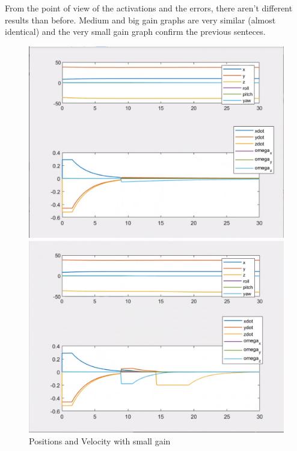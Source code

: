 \documentclass{article}
\begin{document}
From the point of view of the activations and the errors, there aren't different results than before. Medium and big gain graphs are very similar (almost identical) and the very small gain graph confirm the previous senteces.
\begin{figure}[htpb] 
\begin{minipage}{0.40\textwidth}  
\includegraphics[width=\textwidth]{313_s_ppdot.png}
\caption{Positions and Velocity with small gain}\label{ppdot_w_s} 
\end{minipage}  
\hspace{0.2\textwidth} 
\begin{minipage}{0.40\textwidth}  
\includegraphics[width=\textwidth]{313_m_ppdot.png}

\end{minipage}
\end{figure}
\end{document}
